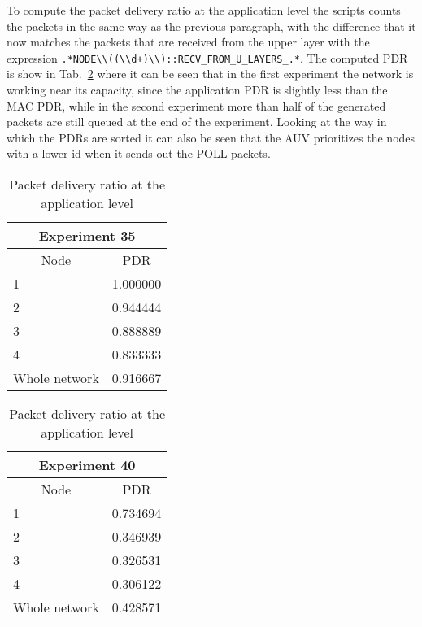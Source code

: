 \documentclass[a4paper,oneside]{article}
\newcommand{\textinlinecode}[1]{\lstinline[basicstyle=\ttfamily,keywordstyle={},stringstyle={},commentstyle={\itshape}]{#1}}
\newcommand{\inlinecode}[1]{\ifmmode\text{\textinlinecode{#1}}\else\textinlinecode{#1}\fi}
\begin{document}
To compute the packet delivery ratio at the application level the
scripts counts the packets in the same way as the previous paragraph,
with the difference that it now matches the packets that are received
from the upper layer with the expression
\inlinecode{.*NODE\\((\\d+)\\)::RECV_FROM_U_LAYERS_.*}. The computed
PDR is show in Tab.~\ref{tab:pdr_app} where it can be seen that in the
first experiment the network is working near its capacity, since the
application PDR is slightly less than the MAC PDR, while in the second
experiment more than half of the generated packets are still queued at
the end of the experiment. Looking at the way in which the PDRs are
sorted it can also be seen that the AUV prioritizes the nodes with a
lower id when it sends out the POLL packets.
\begin{table}[h]
  \centering
  \begin{subtable}{0.5\textwidth}
    \centering
    \begin{tabular}{lr}
      \multicolumn{2}{c}{Experiment 35} \\
      \hline
      \multicolumn{1}{c}{Node} & \multicolumn{1}{c}{PDR} \\
      1 & 1.000000 \\
      2 & 0.944444 \\
      3 & 0.888889 \\
      4 & 0.833333 \\
      Whole network & 0.916667 
    \end{tabular}
  \end{subtable}%
  \begin{subtable}{0.5\textwidth}
    \centering
    \begin{tabular}{lr}
      \multicolumn{2}{c}{Experiment 40} \\
      \hline
      \multicolumn{1}{c}{Node} & \multicolumn{1}{c}{PDR} \\
      1 & 0.734694 \\
      2 & 0.346939 \\
      3 & 0.326531 \\
      4 & 0.306122 \\
      Whole network & 0.428571 
    \end{tabular}
  \end{subtable}
  \caption{Packet delivery ratio at the application level}
  \label{tab:pdr_app}
\end{table}
\end{document}
